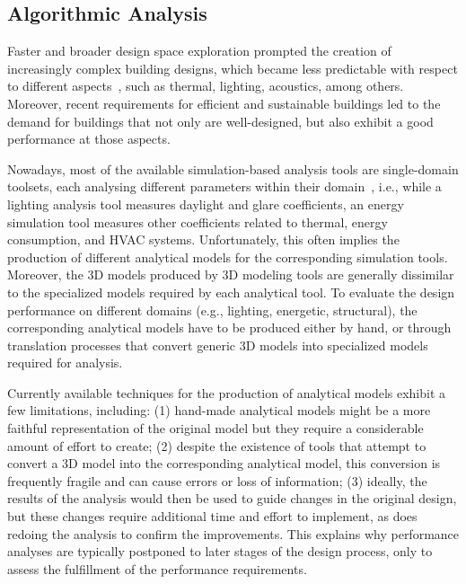 \subsection{Algorithmic Analysis}

Faster and broader design space exploration prompted the creation of increasingly complex building designs, which became less predictable with respect to different aspects~\cite{Branco2017AD}, such as thermal, lighting, acoustics, among others. Moreover, recent requirements for efficient and sustainable buildings led to the demand for buildings that not only are well-designed, but also exhibit a good performance at those aspects.
	
	Nowadays, most of the available simulation-based analysis tools are single-domain toolsets, each analysing different parameters within their domain~\cite{Malkawi2005}, i.e., while a lighting analysis tool measures daylight and glare coefficients, an energy simulation tool measures other coefficients related to thermal, energy consumption, and \ac{HVAC} systems. Unfortunately, this often implies the production of different analytical models for the corresponding simulation tools. Moreover, the 3D models produced by 3D modeling tools are generally dissimilar to the specialized models required by each analytical tool. To evaluate the design performance on different domains (e.g., lighting, energetic, structural), the corresponding analytical models have to be produced either by hand, or through translation processes that convert generic 3D models into specialized models required for analysis.

	Currently available techniques for the production of analytical models exhibit a few limitations, including: (1) hand-made analytical models might be a more faithful representation of the original model but they require a considerable amount of effort to create; (2) despite the existence of tools that attempt to convert a 3D model into the corresponding analytical model, this conversion is frequently fragile and can cause errors or loss of information; (3) ideally, the results of the analysis would then be used to guide changes in the original design, but these changes require additional time and effort to implement, as does redoing the analysis to confirm the improvements. This explains why performance analyses are typically postponed to later stages of the design process, only to assess the fulfillment of the performance requirements.

